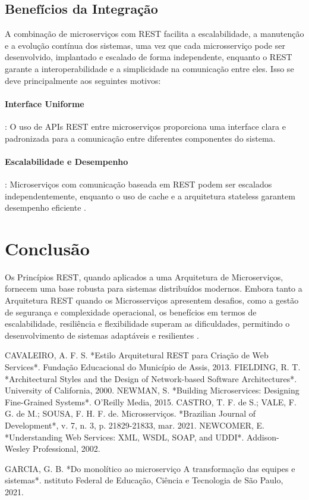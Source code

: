 \documentclass[12pt]{article}
\begin{document}
	\subsection{Benefícios da Integração}
	A combinação de microserviços com REST facilita a escalabilidade, a manutenção e a evolução contínua dos sistemas, uma vez que cada microsserviço pode ser desenvolvido, implantado e escalado de forma independente, enquanto o REST garante a interoperabilidade e a simplicidade na comunicação entre eles. Isso se deve principalmente aos seguintes motivos:
	\paragraph{Interface Uniforme}: O uso de APIs REST entre microserviços proporciona uma interface clara e padronizada para a comunicação entre diferentes componentes do sistema.
	\paragraph{Escalabilidade e Desempenho}: Microserviços com comunicação baseada em REST podem ser escalados independentemente, enquanto o uso de cache e a arquitetura stateless garantem desempenho eficiente \cite{cavaleiro2013}.
	
	\section{Conclusão}
	
	Os Princípios REST, quando aplicados a uma Arquitetura de Microserviços, fornecem uma base robusta para sistemas distribuídos modernos. Embora tanto a Arquitetura REST quando os Microsserviços apresentem desafios, como a gestão de segurança e complexidade operacional, os benefícios em termos de escalabilidade, resiliência e flexibilidade superam as dificuldades, permitindo o desenvolvimento de sistemas adaptáveis e resilientes \cite{fielding2000}.
	
	
	
	\begin{thebibliography}{99}
		 CAVALEIRO, A. F. S. *Estilo Arquitetural REST para Criação de Web Services*. Fundação Educacional do Município de Assis, 2013.
		 FIELDING, R. T. *Architectural Styles and the Design of Network-based Software Architectures*. University of California, 2000.
		 NEWMAN, S. *Building Microservices: Designing Fine-Grained Systems*. O'Reilly Media, 2015.
		 CASTRO, T. F. de S.; VALE, F. G. de M.; SOUSA, F. H. F. de. Microsserviços. *Brazilian Journal of Development*, v. 7, n. 3, p. 21829-21833, mar. 2021.
		 NEWCOMER, E. *Understanding Web Services: XML, WSDL, SOAP, and UDDI*. Addison-Wesley Professional, 2002.
		
		 GARCIA, G. B. *Do monolítico ao microserviço A transformação das equipes e sistemas*. nstituto Federal de Educação, Ciência e Tecnologia de São Paulo, 2021.
				
	\end{thebibliography}
	
\end{document}
